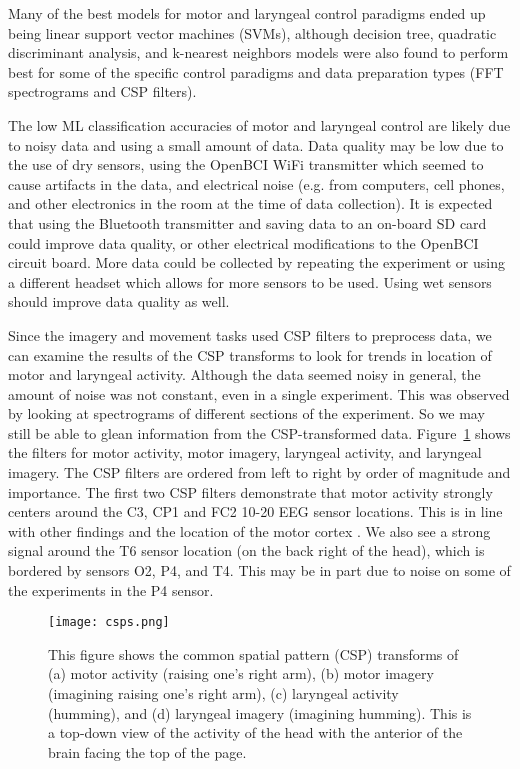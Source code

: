 \documentclass{article}
\begin{document}
Many of the best models for motor and laryngeal control paradigms ended up being linear support vector machines (SVMs), although decision tree, quadratic discriminant analysis, and k-nearest neighbors models were also found to perform best for some of the specific control paradigms and data preparation types (FFT spectrograms and CSP filters).

The low ML classification accuracies of motor and laryngeal control are likely due to noisy data and using a small amount of data. Data quality may be low due to the use of dry sensors, using the OpenBCI WiFi transmitter which seemed to cause artifacts in the data, and electrical noise (e.g. from computers, cell phones, and other electronics in the room at the time of data collection). It is expected that using the Bluetooth transmitter and saving data to an on-board SD card could improve data quality, or other electrical modifications to the OpenBCI circuit board. More data could be collected by repeating the experiment or using a different headset which allows for more sensors to be used. Using wet sensors should improve data quality as well.

Since the imagery and movement tasks used CSP filters to preprocess data, we can examine the results of the CSP transforms to look for trends in location of motor and laryngeal activity. Although the data seemed noisy in general, the amount of noise was not constant, even in a single experiment. This was observed by looking at spectrograms of different sections of the experiment. So we may still be able to glean information from the CSP-transformed data. Figure~\ref{csp_filters} shows the filters for motor activity, motor imagery, laryngeal activity, and laryngeal imagery. The CSP filters are ordered from left to right by order of magnitude and importance.  The first two CSP filters demonstrate that motor activity strongly centers around the C3, CP1 and FC2 10-20 EEG sensor locations. This is in line with other findings and the location of the motor cortex \citep{chen_mi}. We also see a strong signal around the T6 sensor location (on the back right of the head), which is bordered by sensors O2, P4, and T4. This may be in part due to noise on some of the experiments in the P4 sensor.

\begin{figure}
    \centering
    \texttt{[image: csps.png]}
    \caption{This figure shows the common spatial pattern (CSP) transforms of (a) motor activity (raising one's right arm), (b) motor imagery (imagining raising one's right arm), (c) laryngeal activity (humming), and (d) laryngeal imagery (imagining humming). This is a top-down view of the activity of the head with the anterior of the brain facing the top of the page.}
    \label{csp_filters}
\end{figure}
\end{document}
